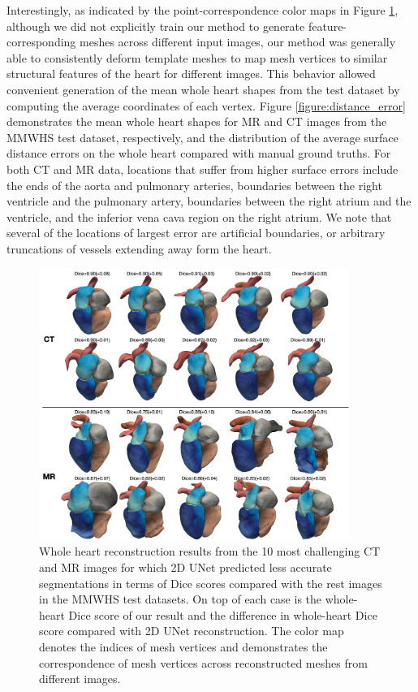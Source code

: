\documentclass[times,review,preprint,authoryear]{elsarticle}
\begin{document}
Interestingly, as indicated by the point-correspondence color maps in Figure \ref{figure:example_meshes}, although we did not explicitly train our method to generate feature-corresponding meshes across different input images, our method was generally able to consistently deform template meshes to map mesh vertices to similar structural features of the heart for different images. This behavior allowed convenient generation of the mean whole heart shapes from the test dataset by computing the average coordinates of each vertex. Figure \ref{figure:distance_error} demonstrates the mean whole heart shapes for MR and CT images from the MMWHS test dataset, respectively, and the distribution of the average surface distance errors on the whole heart compared with manual ground truths. For both CT and MR data, locations that suffer from higher surface errors include the ends of the aorta and pulmonary arteries, boundaries between the right ventricle and the pulmonary artery, boundaries between the right atrium and the ventricle, and the inferior vena cava region on the right atrium. We note that several of the locations of largest error are artificial boundaries, or arbitrary truncations of vessels extending away form the heart. 
\begin{figure}[H]
\centering
\includegraphics[width=0.9\textwidth]{example_meshes.png}
\caption{Whole heart reconstruction results from the 10 most challenging CT and MR images for which 2D UNet predicted less accurate segmentations in terms of Dice scores compared with the rest images in the MMWHS test datasets. On top of each case is the whole-heart Dice score of our result and the difference in whole-heart Dice score compared with 2D UNet reconstruction. The color map denotes the indices of mesh vertices and demonstrates the correspondence of mesh vertices across reconstructed meshes from different images. } 
\label{figure:example_meshes}
\end{figure}
\end{document}
